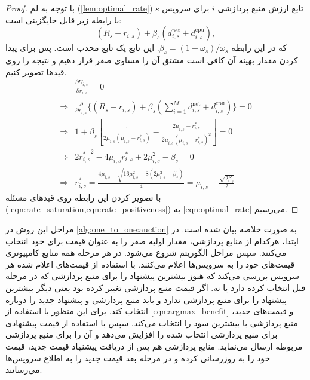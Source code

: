       \begin{proof}
        با توجه به لم (\ref{lem:optimal_rate}) تابع ارزش منبع پردازشی $i$ برای سرویس $s$ با رابطه زیر قابل جایگزینی است:
        \begin{equation}
          (R_s - r_{i,s}) + \beta_s(d_{i,s}^{\text{net}} + d_{i,s}^{\text{cpu}}),
        \end{equation} 
        که در این رابطه $\beta_s=(1-\omega_s)/\omega_s$.
        این تابع یک تابع محدب است.
        پس برای پیدا کردن مقدار بهینه آن کافی است مشتق آن را مساوی صفر قرار دهیم و نتیجه را روی قید‌ها تصویر کنیم.
        \begin{align*}
          & \frac{\partial U_{i,s}}{\partial r_{i,s}} = 0 \\
          \Rightarrow &\frac{\partial}{\partial r_{i,s}}\{(R_s - r_{i,s}) + \beta_s(\sum_{i=1}^M d_{i,s}^{\text{net}} + d_{i,s}^{\text{cpu}})\} = 0 \\
          \Rightarrow & 1 + \beta_s[ \frac{1}{2\mu_{i,s}(\mu_{i,s}-r_{i,s}^*)} - \frac{2\mu_{i,s}-r_{i,s}^*}{2\mu_{i,s}(\mu_{i,s}-r_{i,s}^*)^2}] = 0 \\
          \Rightarrow & 2 {r_{i,s}^*}^2 - 4 \mu_{i,s} r_{i,s}^* + 2 \mu_{i,s}^2 - \beta_s = 0 \\
          \Rightarrow & r_{i,s}^* = \frac{4 \mu_{i,s} - \sqrt{16 \mu_{i,s}^2 - 8(2\mu_{i,s}^2 - \beta_s)}}{4} = \mu_{i,s} - \frac{\sqrt{2\beta_s}}{2}
        \end{align*}
        با تصویر کردن این رابطه روی قید‌های مسئله (\cref{eqn:rate_saturation,eqn:rate_positiveness}) به \cref{eqn:optimal_rate} می‌رسیم.
      \end{proof}  

      مراحل این روش در \cref{alg:one_to_one:auction} به صورت خلاصه بیان شده است.
      در ابتدا، هرکدام از منابع پردازشی، مقدار اولیه صفر را به عنوان قیمت برای خود انتخاب می‌کنند.
      سپس مراحل الگوریتم شروع می‌شود.
      در هر مرحله همه منابع کامپیوتری قیمت‌های خود را به سرویس‌ها اعلام می‌کنند.
      با استفاده از قیمت‌های اعلام شده هر سرویس بررسی می‌کند که هنوز بیشترین پیشنهاد را برای منبع پردازشی که در مرحله قبل انتخاب کرده دارد یا نه.
      اگر قیمت منبع پردازشی تغییر کرده بود یعنی دیگر بیشترین پیشنهاد را برای منبع پردازشی ندارد و باید منبع پردازشی و پیشنهاد جدید را دوباره انتخاب کند.
      برای این منظور با استفاده از \cref{eqn:argmax_benefit} و قیمت‌های جدید، منبع پردازشی با بیشترین سود را انتخاب می‌کند.
      سپس با استفاده از  قیمت پیشنهادی برای منبع پردازشی انتخاب شده را افزایش می‌دهد و آن را برای منبع پردازشی مربوطه ارسال می‌نماید.
      منابع پردازشی هم پس از دریافت پیشنهاد قیمت جدید، قیمت خود را به روزرسانی کرده و در مرحله بعد قیمت جدید را به اطلاع سرویس‌ها می‌رسانند.
      

